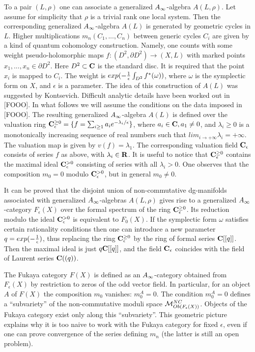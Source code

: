 \documentclass[a4paper,12pt]{article}
\begin{document}
To a pair $(L,\rho)$ one can associate a generalized $A_{\infty}$-algebra
$A(L,\rho)$. Let assume for simplicity that $\rho$ is a trivial
rank one local system. Then the corresponding generalized $A_{\infty}$-algebra $A(L)$
is generated by geometric cycles in $L$. Higher multiplications
$m_n(C_1,...,C_n)$ between generic cycles $C_i$ are
given by a kind of quantum cohomology construction. Namely,
one counts with some weight 
pseudo-holomorphic maps $f:(D^2,\partial D^2)\to (X,L)$ 
with marked points $x_1,...,x_n\in \partial D^2$.
Here $D^2\subset {\bf C}$ is the standard disc. It is required 
that the point $x_i$ is mapped to $C_i$. The weight is
$exp(-{1\over{\epsilon}}\int_{D^2}f^{\ast}(\omega))$, where
$\omega$ is the symplectic form on $X$, and $\epsilon$ is a parameter.
The idea of this construction of $A(L)$ was suggested by Kontsevich.
Difficult analytic details have been worked out in [FOOO].
In what follows we will assume the conditions on the data imposed in  [FOOO]. 
The resulting generalized $A_{\infty}$-algebra $A(L)$ is defined
over the valuation ring 
${\bf C}_{\epsilon}^{\ge 0}=\{f=\sum_{i\ge 1}a_ie^{-\lambda_i/\epsilon}\}$,
where $a_i\in {\bf C},a_1\ne 0$,
and $\lambda_i\ge 0$ is a monotonically increasing sequence of real
numbers such that $lim_{i\to +\infty}\lambda_i=+\infty$.
The valuation map is given by $v(f)=\lambda_1$.
The corresponding valuation field ${\bf C}_{\epsilon}$ consists of series $f$
as above,
with $\lambda_i\in {\bf R}$. It is useful to notice
that ${\bf C}_{\epsilon}^{\ge 0}$ contains the maximal ideal 
${\bf C}_{\epsilon}^{>0}$ consisting
of series with all $\lambda_i>0$.
One observes that the composition $m_0=0$ modulo ${\bf C}_{\epsilon}^{>0}$, but in general
$m_0\ne 0$.

It can be proved that the disjoint union of non-commutative dg-manifolds
associated with generalized $A_{\infty}$-algebras $A(L,\rho)$ gives rise
to a generalized $A_{\infty}$-category $F_{\epsilon}(X)$ over the 
formal spectrum of the ring
${\bf C}_{\epsilon}^{\ge 0}$. Its reduction modulo the ideal
${\bf C}_{\epsilon}^{>0}$ is equivalent to $F_0(X)$.
If the symplectic form $\omega$ satisfies certain rationality
conditions then one can introduce a new
parameter $q=exp(-{1\over{\epsilon}})$,
thus replacing the ring ${\bf C}_{\epsilon}^{\ge 0}$ by the ring of formal series
${\bf C}[[q]]$. Then the maximal ideal is just $q{\bf C}[[q]]$, and the  field
${\bf C}_{\epsilon}$ coincides with the field of Laurent series ${\bf C}((q))$.

The Fukaya category $F(X)$ is defined as an $A_{\infty}$-category obtained
from $F_{\epsilon}(X)$ by restriction to zeros of the odd vector field.
In particular, for an object $A$ of $F(X)$ the composition $m_0$ vanishes:
$m_0^A=0$. The condition $m_0^A=0$ defines a 
``subvariety'' of the non-commutative
moduli space ${\cal M}^{NC}_{Ob(F_{\epsilon}(X))}$. Objects of the Fukaya
category exist only along this ``subvariety''. This geometric picture
explains why
it is too naive to work with the Fukaya category for fixed $\epsilon$,
even if one can prove convergence of the series defining $m_n$
(the latter is still an open problem).
\end{document}
